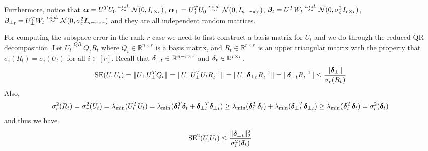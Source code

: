 \documentclass[10pt]{article}
\newcommand{\R}{\mathbb{R}}
\newcommand{\SE}{\mathrm{SE}}
\begin{document}
Furthermore, notice that $\bm{\alpha} = U^T U_0 \overset{i.i.d.}{\sim} \mathcal{N}(0, I_{r \times r})$, $\bm{\alpha}_{\perp} = U_\perp^T U_0 \overset{i.i.d.}{\sim} \mathcal{N}(0, I_{n- r \times r})$, $\bm{\beta}_t = U^T W_t \overset{i.i.d.}{\sim} \mathcal{N}(0, \sigma_c^2 I_{r \times r})$, ${\bm{\beta}_{\perp}}_t = U_\perp^T W_t \overset{i.i.d.}{\sim} \mathcal{N}(0, \sigma_c^2 I_{n- r \times r})$ and they are all independent random matrices. 

For computing the subspace error in the rank $r$ case we need to first construct a basis matrix for $U_t$ and we do through the reduced QR decomposition. Let $U_t \overset{QR}{=} Q_t R_t$ where $Q_t \in \R^{n \times r}$ is a basis matrix, and $R_t \in \R^{r \times r}$ is an upper triangular matrix with the property that $\sigma_i(R_t) = \sigma_i(U_t)$ for all $ i \in [r]$. Recall that $\utsin_t \in \R^{n -r \times r}$ and $\utcos_t \in \R^{r \times r}$. 
\begin{align*}
\SE(U, U_t) = \|U_\perp U_\perp^T Q_t\| = \|U_\perp U_\perp^T U_t R_t^{-1}\|  = \|U_\perp \utsin_t R_t^{-1}\| = \|\utsin_t R_t^{-1}\| \leq \frac{\|\utsin\|}{\sigma_{r}(R_t)}
\end{align*}
Also,
\begin{align*}
\sigma_r^2(R_t) = \sigma_{r}^2(U_t) = \lambda_{\min}(U_t^T U_t) = \lambda_{\min}(\bm{\delta}_t^T \bm{\delta}_t + {\bm{\delta}_{\perp}}_t^T {\bm{\delta}_{\perp}}_t) \geq \lambda_{\min}(\bm{\delta}_t^T \bm{\delta}_t) + \lambda_{\min}({\bm{\delta}_{\perp}}_t^T {\bm{\delta}_{\perp}}_t) \geq \lambda_{\min}(\bm{\delta}_t^T \bm{\delta}_t) = \sigma_r^2(\bm{\delta}_t)
\end{align*}
and thus we have 
\begin{align*}
\SE^2(U_,U_t) \leq \frac{\|\utsin_t\|_2^2}{\sigma_r^2(\utcos_t)}
\end{align*}
\end{document}

